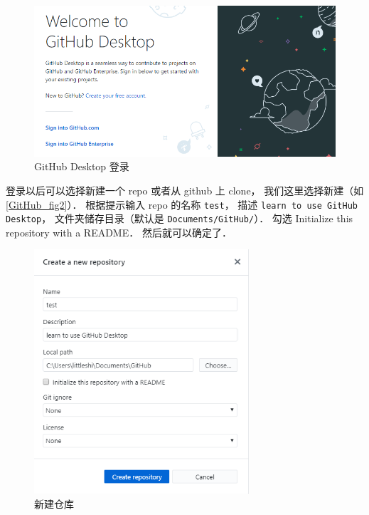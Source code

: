 \begin{figure}[ht]
\centering
\includegraphics[width=13cm]{./figures/GitHub1.png}
\caption{GitHub Desktop 登录} \label{GitHub_fig1}
\end{figure}

登录以后可以选择新建一个 repo 或者从 github 上 clone， 我们这里选择新建（如\autoref{GitHub_fig2}）． 根据提示输入 repo 的名称 \lstinline|test|， 描述 \lstinline|learn to use GitHub Desktop|， 文件夹储存目录（默认是 \lstinline|Documents/GitHub/|）． 勾选 Initialize this repository with a README． 然后就可以确定了．

\begin{figure}[ht]
\centering
\includegraphics[width=8cm]{./figures/GitHub3.png}
\caption{新建仓库} \label{GitHub_fig2}
\end{figure}

